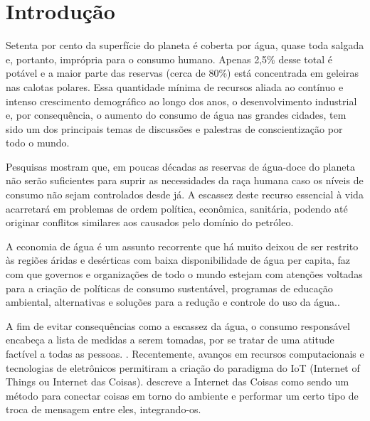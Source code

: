 \chapter[Introdução]{Introdução}

Setenta por cento da superfície do planeta é coberta por água, quase toda salgada e, portanto, imprópria para o consumo humano. Apenas 2,5\% desse total é potável e a maior parte das reservas (cerca de 80\%) está concentrada em geleiras nas calotas polares. 
Essa quantidade mínima de recursos aliada ao contínuo e intenso crescimento demográfico ao longo dos anos, o desenvolvimento industrial e, por consequência, o aumento do consumo de água nas grandes cidades, tem sido um dos principais temas de discussões e palestras de conscientização por todo o mundo.\cite{aguaconsumo}

Pesquisas \cite{Diarias2007} mostram que, em poucas décadas as reservas de água-doce do planeta não serão suficientes para suprir as necessidades da raça humana caso os níveis de consumo não sejam controlados desde já. A escassez deste recurso essencial à vida acarretará em problemas de ordem política, econômica, sanitária, podendo até originar conflitos similares aos causados pelo domínio do petróleo.

A economia de água é um assunto recorrente que há muito deixou de ser restrito às regiões áridas e desérticas com baixa disponibilidade de água per capita, faz com que governos e organizações de todo o mundo estejam com atenções voltadas para a criação de políticas de consumo sustentável, programas de educação ambiental, alternativas e soluções para a redução e controle do uso da água.\cite{ferreirasistema}.

A fim de evitar consequências como a escassez da água, o consumo
responsável encabeça a lista de medidas a serem tomadas, por se tratar de uma atitude factível a todas as pessoas. \cite{Diarias2007}. Recentemente, avanços em recursos computacionais e tecnologias de eletrônicos permitiram a criação do paradigma do IoT (Internet of Things ou Internet das Coisas). \cite{Perumal2016} descreve a Internet das Coisas como sendo um método para conectar coisas em torno do ambiente e performar um certo tipo de troca de mensagem entre eles, integrando-os.

